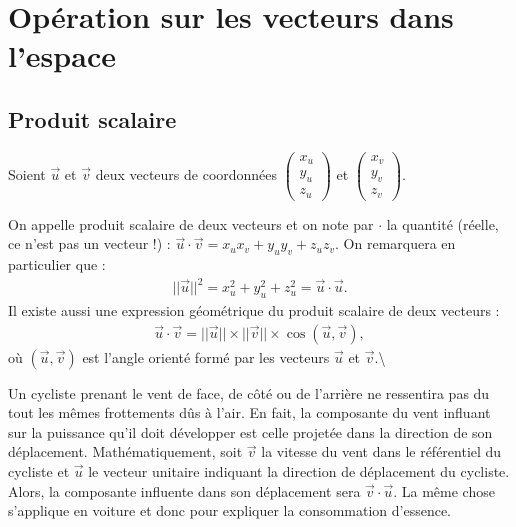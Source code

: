 \documentclass[letterpaper,10pt,english]{jupyterBook}
\begin{document}
\section{Opération sur les vecteurs dans l’espace}
\label{\detokenize{Part1/Cours:operation-sur-les-vecteurs-dans-l-espace}}

\subsection{Produit scalaire}
\label{\detokenize{Part1/Cours:produit-scalaire}}
\sphinxAtStartPar
Soient \(\vec{u}\) et \(\vec{v}\) deux vecteurs de coordonnées \(\begin{pmatrix} x_u \\ y_u \\ z_u \end{pmatrix}\) et \(\begin{pmatrix} x_v \\ y_v \\ z_v \end{pmatrix}\).

\sphinxAtStartPar
On appelle produit scalaire de deux vecteurs et on note par \(\cdot\) la quantité (réelle, ce n’est pas un vecteur !) :
\(\vec{u} \cdot \vec{v} = x_u x_v + y_u y_v + z_u z_v.\)
On remarquera en particulier que :
\begin{equation*}
\begin{split}||\vec{u}||^2 = x_u^2 + y_u^2 + z_u^2 = \vec{u}\cdot\vec{u}.\end{split}
\end{equation*}
\sphinxAtStartPar
Il existe aussi une expression géométrique du produit scalaire de deux vecteurs :
\begin{equation*}
\begin{split}
\vec{u} \cdot \vec{v} = ||\vec{u}|| \times ||\vec{v}|| \times \cos(\vec{u},\vec{v}),
\end{split}
\end{equation*}
\sphinxAtStartPar
où \((\vec{u},\vec{v})\) est l’angle orienté formé par les vecteurs \(\vec{u}\) et \(\vec{v}\).\textbackslash{}

\sphinxAtStartPar
{} Un cycliste prenant le vent de face, de côté ou de l’arrière ne ressentira pas du tout les mêmes frottements dûs à l’air. En fait, la composante du vent influant sur la puissance qu’il doit développer est celle projetée dans la direction de son déplacement. Mathématiquement, soit \(\vec{v}\) la vitesse du vent dans le référentiel du cycliste et \(\vec{u}\) le vecteur unitaire indiquant la direction de déplacement du cycliste. Alors, la composante influente dans son déplacement sera \(\vec{v} \cdot \vec{u}\). La même chose s’applique en voiture et donc pour expliquer la consommation d’essence.
\end{document}

